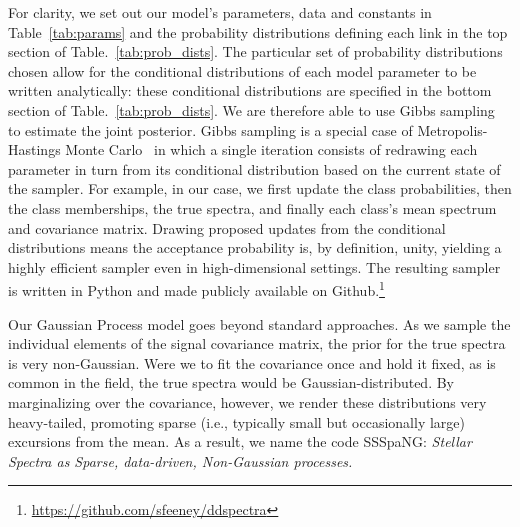 \documentclass[a4paper,fleqn,usenatbib]{mnras}
\begin{document}
For clarity, we set out our model's parameters, data and constants in Table~\ref{tab:params} and the probability distributions defining each link in the top section of Table.~\ref{tab:prob_dists}. The particular set of probability distributions chosen allow for the conditional distributions of each model parameter to be written analytically: these conditional distributions are specified in the bottom section of Table.~\ref{tab:prob_dists}. We are therefore able to use Gibbs sampling~\citep{Geman_and_Geman:1984} to estimate the joint posterior. Gibbs sampling is a special case of Metropolis-Hastings Monte Carlo~\citep{Hastings:1970} in which a single iteration consists of redrawing each parameter in turn from its conditional distribution based on the current state of the sampler. For example, in our case, we first update the class probabilities, then the class memberships, the true spectra, and finally each class's mean spectrum and covariance matrix. Drawing proposed updates from the conditional distributions means the acceptance probability is, by definition, unity, yielding a highly efficient sampler even in  high-dimensional settings. The resulting sampler is written in Python and made publicly available on Github.\footnote{\href{https://github.com/sfeeney/ddspectra}{https://github.com/sfeeney/ddspectra}}

Our Gaussian Process model goes beyond standard approaches. As we sample the individual elements of the signal covariance matrix, the prior for the true spectra is very non-Gaussian. Were we to fit the covariance once and hold it fixed, as is common in the field, the true spectra would be Gaussian-distributed. By marginalizing over the covariance, however, we render these distributions very heavy-tailed, promoting sparse (i.e., typically small but occasionally large) excursions from the mean. As a result, we name the code SSSpaNG: {\em Stellar Spectra as Sparse, data-driven, Non-Gaussian processes.}
\end{document}
